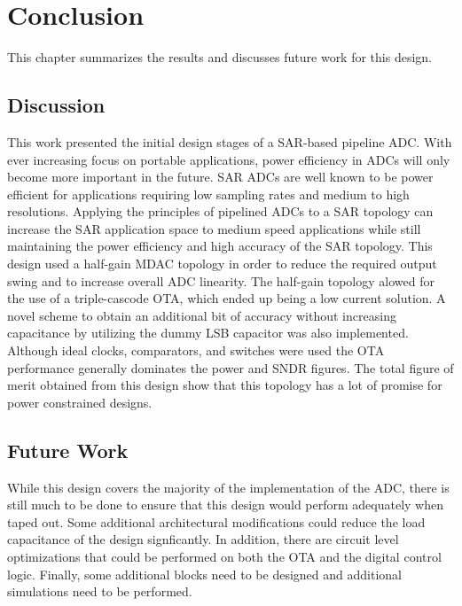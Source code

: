 \chapter{Conclusion}
This chapter summarizes the results and discusses future work for this design.
\section{Discussion}
This work presented the initial design stages of a SAR-based pipeline ADC. With ever increasing focus on portable applications, power efficiency in ADCs will only become more important in the future. SAR ADCs are well known to be power efficient for applications requiring low sampling rates and medium to high resolutions. Applying the principles of pipelined ADCs to a SAR topology can increase the SAR application space to medium speed applications while still maintaining the power efficiency and high accuracy of the SAR topology. This design used a half-gain MDAC topology in order to reduce the required output swing and to increase overall ADC linearity. The half-gain topology alowed for the use of a triple-cascode OTA, which ended up being a low current solution. A novel scheme to obtain an additional bit of accuracy without increasing capacitance by utilizing the dummy LSB capacitor was also implemented. Although ideal clocks, comparators, and switches were used the OTA performance generally dominates the power and SNDR figures. The total figure of merit obtained from this design show that this topology has a lot of promise for power constrained designs.
\section{Future Work}
While this design covers the majority of the implementation of the ADC, there is still much to be done to ensure that this design would perform adequately when taped out. Some additional architectural modifications could reduce the load capacitance of the design signficantly. In addition, there are circuit level optimizations that could be performed on both the OTA and the digital control logic. Finally, some additional blocks need to be designed and additional simulations need to be performed. 

